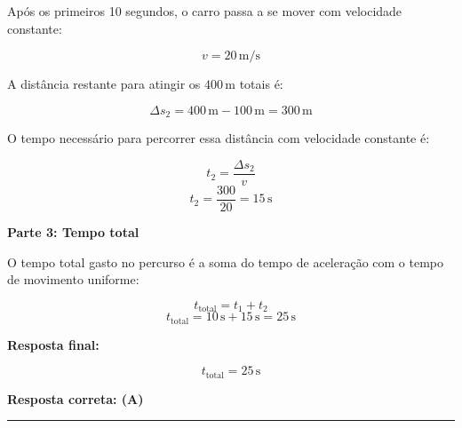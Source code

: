 \documentclass[a4paper,12pt]{article}
\begin{document}
\begin{flushleft}
Após os primeiros 10 segundos, o carro passa a se mover com velocidade constante:

\[
v = 20 \, \text{m/s}
\]

A distância restante para atingir os \(400 \, \text{m}\) totais é:

\[
\Delta s_2 = 400 \, \text{m} - 100 \, \text{m} = 300 \, \text{m}
\]

O tempo necessário para percorrer essa distância com velocidade constante é:

\[
t_2 = \frac{\Delta s_2}{v}
\]
\[
t_2 = \frac{300}{20} = 15 \, \text{s}
\]

\vspace{0.5cm}

\textbf{Parte 3: Tempo total}

O tempo total gasto no percurso é a soma do tempo de aceleração com o tempo de movimento uniforme:

\[
t_{\text{total}} = t_1 + t_2
\]
\[
t_{\text{total}} = 10 \, \text{s} + 15 \, \text{s} = 25 \, \text{s}
\]

\vspace{0.5cm}

\textbf{Resposta final:}

\[
\boxed{t_{\text{total}} = 25 \, \text{s}}
\]

\textbf{Resposta correta: \colorbox{green!50}{(A)}}

\end{flushleft}
\noindent\rule{\linewidth}{0.6pt}\\
\end{document}
